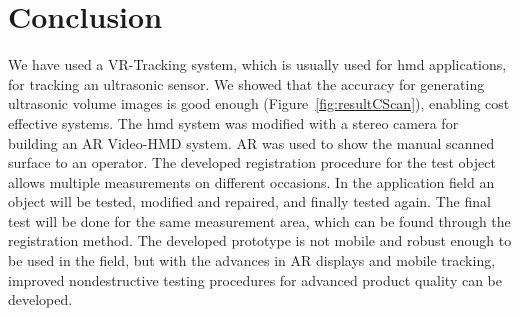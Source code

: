 \documentclass{VRARWorkshop}
\begin{document}
\section{Conclusion}

We have used a VR-Tracking system, which is usually used for {\sc hmd} applications, for tracking an ultrasonic sensor.
We showed that the accuracy for generating ultrasonic volume images is good enough (Figure~\ref{fig:resultCScan}), enabling cost effective systems.
The {\sc hmd} system was modified with a stereo camera for building an AR {\sc Video-HMD} system.
AR was used to show the manual scanned surface to an operator.
The developed registration procedure for the test object allows multiple measurements on different occasions.
In the application field an object will be tested, modified and repaired, and finally tested again.
The final test will be done for the same measurement area, which can be found through the registration method.
The developed prototype is not mobile and robust enough to be used in the field, but with the advances in AR displays and mobile tracking, improved nondestructive testing procedures for advanced product quality can be developed.

\VRARsetbibstyle

\end{document}
